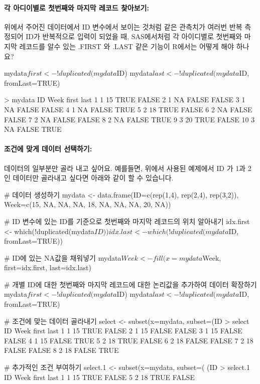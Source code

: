 \documentclass{book}
\begin{document}
\paragraph{각 아디이별로 첫번째와 마지막 레코드 찾아보기: } 위에서 주어진 데이터에서 ID 변수에서 보이는 것처럼 같은 관측치가 여러번 반복 측정되어 ID가 반복적으로 입력이 되었을 때, SAS에서처럼 각 아이디별로 첫번째와 마지막 레코드를 알수 있는 .FIRST 와 .LAST 같은 기능이 R에서는 어떻게 해야 하나요?

\begin{Schunk}
\begin{Soutput}
mydata$first <- !duplicated(mydata$ID)
mydata$last <- !duplicated(mydata$ID, fromLast=TRUE)		

> mydata
   ID Week first  last
1   1   15  TRUE FALSE
2   1   NA FALSE FALSE
3   1   NA FALSE FALSE
4   1   NA FALSE  TRUE
5   2   18  TRUE FALSE
6   2   NA FALSE FALSE
7   2   NA FALSE FALSE
8   2   NA FALSE  TRUE
9   3   20  TRUE FALSE
10  3   NA FALSE  TRUE
	\end{Soutput}	
\end{Schunk}

\paragraph{조건에 맞게 데이터 선택하기:} 데이터의 일부분만 골라 내고 싶어요.  예를들면, 위에서 사용된 예제에서 ID 가 1과 2인 데이터만 골라내고 싶다면 아래와 같이 할 수 있습니다. 

\begin{Schunk}
\begin{Soutput}
# 데이터 생성하기
mydata <- data.frame(ID=c(rep(1,4), rep(2,4), rep(3,2)), Week=c(15, NA, NA, NA, 18, NA, NA, NA, 20, NA))

# ID 변수에 있는 ID를 기준으로 첫번째와 마지막 레코드의 위치 알아내기 
idx.first <- which(!duplicated(mydata$ID))
idx.last <- which(!duplicated(mydata$ID, fromLast=TRUE))

# ID에 있는 NA값을 채워넣기 
mydata$Week <- fill(x=mydata$Week, first=idx.first, last=idx.last)

# 개별 ID에 대한 첫번째와 마지막 레코드에 대한 논리값을 추가하여 데이터 확장하기 
mydata$first <- !duplicated(mydata$ID)
mydata$last <- !duplicated(mydata$ID, fromLast=TRUE)

# 조건에 맞는 데이터 골라내기 
select <- subset(x=mydata, subset=(ID %
> select
  ID Week first  last
1  1   15  TRUE FALSE
2  1   15 FALSE FALSE
3  1   15 FALSE FALSE
4  1   15 FALSE  TRUE
5  2   18  TRUE FALSE
6  2   18 FALSE FALSE
7  2   18 FALSE FALSE
8  2   18 FALSE  TRUE

# 추가적인 조건 부여하기
select.1 <- subset(x=mydata, subset=( (ID %
> select.1
  ID Week first  last
1  1   15  TRUE FALSE
5  2   18  TRUE FALSE
\end{Soutput}
\end{Schunk}
\end{document}
